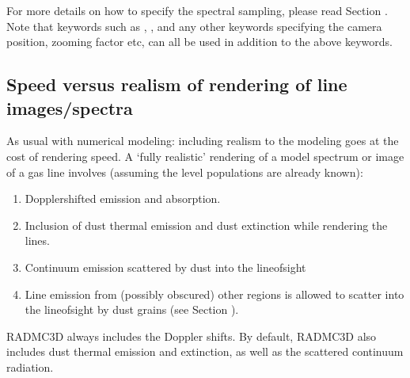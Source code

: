 \documentclass[letterpaper,10pt,english]{sphinxmanual}
\begin{document}
For more details on how to specify the spectral sampling, please read Section
{\hyperref[\detokenize{imagesspectra:sec-set-camera-frequencies}]{}}. Note that keywords such as , ,
and any other keywords specifying the camera position, zooming factor etc, can
all be used in addition to the above keywords.


\subsection{Speed versus realism of rendering of line images/spectra}
\label{\detokenize{lineradtrans:speed-versus-realism-of-rendering-of-line-images-spectra}}\label{\detokenize{lineradtrans:sec-line-render-speed-realism}}
As usual with numerical modeling: including realism to the modeling goes at
the cost of rendering speed. A ‘fully realistic’ rendering of a model
spectrum or image of a gas line involves (assuming the level populations
are already known):
\begin{enumerate}
%
\item {} 
Doppler\sphinxhyphen{}shifted emission and absorption.

\item {} 
Inclusion of dust thermal emission and dust extinction while rendering
the lines.

\item {} 
Continuum emission scattered by dust into the line\sphinxhyphen{}of\sphinxhyphen{}sight

\item {} 
Line emission from (possibly obscured) other regions is allowed to
scatter into the line\sphinxhyphen{}of\sphinxhyphen{}sight by dust grains (see Section
{\hyperref[\detokenize{lineradtrans:sec-line-scat-off-dust}]{}}).

\end{enumerate}

RADMC\sphinxhyphen{}3D always includes the Doppler shifts. By default, RADMC\sphinxhyphen{}3D also
includes dust thermal emission and extinction, as well as the scattered
continuum radiation.
\end{document}
